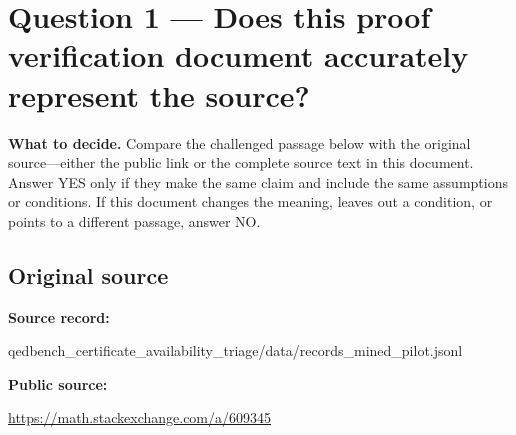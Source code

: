 \documentclass[11pt]{article}
\begin{document}
\section*{Question 1 --- Does this proof verification document accurately represent the source?}
\textbf{What to decide.} Compare the challenged passage below with the original source---either the public link or the complete source text in this document. Answer YES only if they make the same claim and include the same assumptions or conditions. If this document changes the meaning, leaves out a condition, or points to a different passage, answer NO.
\subsection*{Original source}
\textbf{Source record:}
\begin{Vsrc}
qedbench_certificate_availability_triage/data/records_mined_pilot.jsonl
\end{Vsrc}
\textbf{Public source:}\par
\url{https://math.stackexchange.com/a/609345}\par
\end{document}
